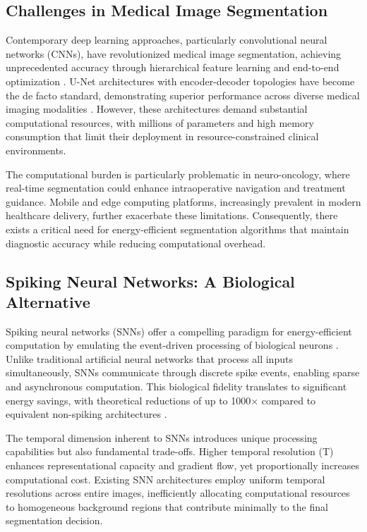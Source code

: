 \documentclass[12pt,a4paper]{article}
\begin{document}
\subsection{Challenges in Medical Image Segmentation}

Contemporary deep learning approaches, particularly convolutional neural networks (CNNs), have revolutionized medical image segmentation, achieving unprecedented accuracy through hierarchical feature learning and end-to-end optimization \cite{ronneberger2015u}. U-Net architectures with encoder-decoder topologies have become the de facto standard, demonstrating superior performance across diverse medical imaging modalities \cite{wang2022medical}. However, these architectures demand substantial computational resources, with millions of parameters and high memory consumption that limit their deployment in resource-constrained clinical environments.

The computational burden is particularly problematic in neuro-oncology, where real-time segmentation could enhance intraoperative navigation and treatment guidance. Mobile and edge computing platforms, increasingly prevalent in modern healthcare delivery, further exacerbate these limitations. Consequently, there exists a critical need for energy-efficient segmentation algorithms that maintain diagnostic accuracy while reducing computational overhead.

\subsection{Spiking Neural Networks: A Biological Alternative}

Spiking neural networks (SNNs) offer a compelling paradigm for energy-efficient computation by emulating the event-driven processing of biological neurons \cite{maass1997networks}. Unlike traditional artificial neural networks that process all inputs simultaneously, SNNs communicate through discrete spike events, enabling sparse and asynchronous computation. This biological fidelity translates to significant energy savings, with theoretical reductions of up to 1000$\times$ compared to equivalent non-spiking architectures \cite{tavanaei2019deep}.

The temporal dimension inherent to SNNs introduces unique processing capabilities but also fundamental trade-offs. Higher temporal resolution (T) enhances representational capacity and gradient flow, yet proportionally increases computational cost. Existing SNN architectures employ uniform temporal resolutions across entire images, inefficiently allocating computational resources to homogeneous background regions that contribute minimally to the final segmentation decision.
\end{document}
